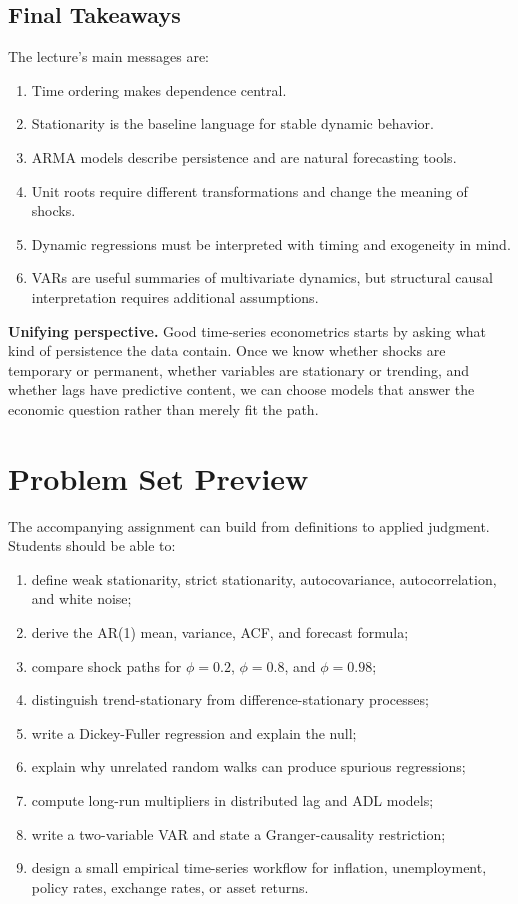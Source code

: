 \subsection{Final Takeaways}
The lecture's main messages are:
\begin{enumerate}
\item Time ordering makes dependence central.
\item Stationarity is the baseline language for stable dynamic behavior.
\item ARMA models describe persistence and are natural forecasting tools.
\item Unit roots require different transformations and change the meaning of shocks.
\item Dynamic regressions must be interpreted with timing and exogeneity in mind.
\item VARs are useful summaries of multivariate dynamics, but structural causal interpretation requires additional assumptions.
\end{enumerate}

\begin{boxD}
\textbf{Unifying perspective.}
Good time-series econometrics starts by asking what kind of persistence the data contain. Once we know whether shocks are temporary or permanent, whether variables are stationary or trending, and whether lags have predictive content, we can choose models that answer the economic question rather than merely fit the path.
\end{boxD}

\section{Problem Set Preview}
The accompanying assignment can build from definitions to applied judgment. Students should be able to:
\begin{enumerate}
\item define weak stationarity, strict stationarity, autocovariance, autocorrelation, and white noise;
\item derive the AR(1) mean, variance, ACF, and forecast formula;
\item compare shock paths for $\phi=0.2$, $\phi=0.8$, and $\phi=0.98$;
\item distinguish trend-stationary from difference-stationary processes;
\item write a Dickey-Fuller regression and explain the null;
\item explain why unrelated random walks can produce spurious regressions;
\item compute long-run multipliers in distributed lag and ADL models;
\item write a two-variable VAR and state a Granger-causality restriction;
\item design a small empirical time-series workflow for inflation, unemployment, policy rates, exchange rates, or asset returns.
\end{enumerate}

